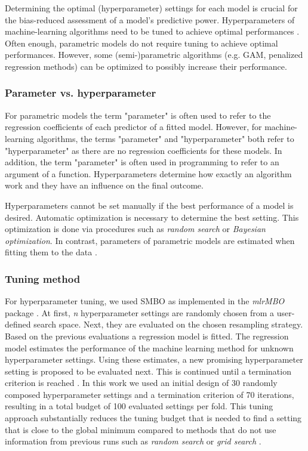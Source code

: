 \documentclass[review]{elsarticle}
\begin{document}
Determining the optimal (hyperparameter) settings for each model is crucial for the bias-reduced assessment of a model's predictive power.
Hyperparameters of machine-learning algorithms need to be tuned to achieve optimal performances \citep{Bergstra2012, Duarte2017, Hutter2011}.
Often enough, parametric models do not require tuning to achieve optimal performances.
However, some (semi-)parametric algorithms (e.g. \ac{GAM}, penalized regression methods) can be optimized to possibly increase their performance.

\subsubsection{Parameter vs. hyperparameter}
For parametric models the term "parameter" is often used to refer to the regression coefficients of each predictor of a fitted model.
However, for machine-learning algorithms, the terms "parameter" and "hyperparameter" both refer to "hyperparameter" as there are no regression coefficients for these models.
In addition, the term "parameter" is often used in programming to refer to an argument of a function.
Hyperparameters determine how exactly an algorithm work and they have an influence on the final outcome. 

Hyperparameters cannot be set manually if the best performance of a model is desired. 
Automatic optimization is necessary to determine the best setting.
This optimization is done via procedures such as \textit{random search} or \textit{Bayesian optimization}.
In contrast, parameters of parametric models are estimated when fitting them to the data \citep{Kuhn2013}.

\subsubsection{Tuning method}
For hyperparameter tuning, we used \ac{SMBO} as implemented in the \textit{mlrMBO} package \citep{mlrMBO}.
At first, \textit{n} hyperparameter settings are randomly chosen from a user-defined search space.
Next, they are evaluated on the chosen resampling strategy.
Based on the previous evaluations a regression model is fitted. 
The regression model estimates the performance of the machine learning method for unknown hyperparameter settings. 
Using these estimates, a new promising hyperparameter setting is proposed to be evaluated next.
This is continued until a termination criterion is reached \citep{Hutter2011, Jones1998}.
In this work we used an initial design of 30 randomly composed hyperparameter settings and a termination criterion of 70 iterations, resulting in a total budget of 100 evaluated settings per fold.
This tuning approach substantially reduces the tuning budget that is needed to find a setting that is close to the global minimum compared to methods that do not use information from previous runs such as \textit{random search} or \textit{grid search} \citep{Bergstra2012}.
\end{document}
